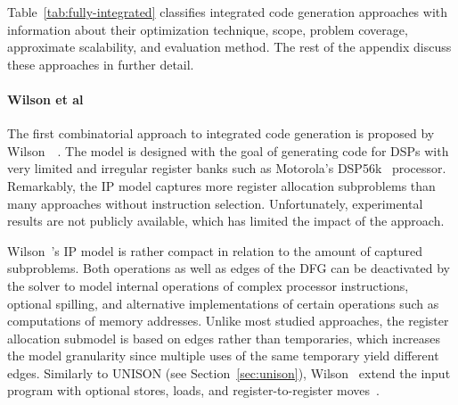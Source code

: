 \documentclass[acmsmall,authorversion,nonacm]{acmart}
\begin{document}
Table~\ref{tab:fully-integrated} classifies integrated code generation
approaches with information about their optimization technique, scope,
problem coverage, approximate scalability, and evaluation method.
The rest of the appendix discuss these approaches in further detail.

\paragraph{Wilson et al}

The first combinatorial approach to integrated code generation
is proposed by Wilson~\etal{}~\cite{Wilson1994,Wilson2002}.
The model is designed with the goal of generating code for DSPs with
very limited and irregular register banks such as Motorola's
DSP56k~\cite{Kloker1987} processor.
Remarkably, the IP model captures more register allocation subproblems
than many approaches without instruction selection.
Unfortunately, experimental results are not publicly available, which
has limited the impact of the approach.

Wilson~\etal{}'s IP model is rather compact in relation to the amount
of captured subproblems.
Both operations as well as edges of the DFG can be deactivated by the
solver to model internal operations of complex processor instructions,
optional spilling, and alternative implementations of certain
operations such as computations of memory addresses.
Unlike most studied approaches, the register allocation submodel is
based on edges rather than temporaries, which increases the model
granularity since multiple uses of the same temporary yield different
edges.
Similarly to UNISON (see
Section~\ref{sec:unison}),
Wilson~\etal{} extend the input program with optional stores, loads,
and register-to-register moves~\cite{Wilson2002}.
\end{document}
